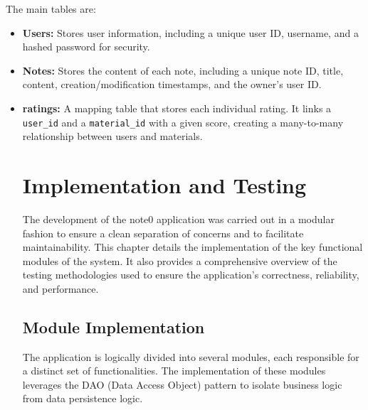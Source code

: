 \documentclass[12pt, a4paper]{report}
\begin{document}
The main tables are:
\begin{itemize}
    \item \textbf{Users:} Stores user information, including a unique user ID, username, and a hashed password for security.
    \item \textbf{Notes:} Stores the content of each note, including a unique note ID, title, content, creation/modification timestamps, and the owner's user ID.
   \item \textbf{ratings:} A mapping table that stores each individual rating. It links a \texttt{user\_id} and a \texttt{material\_id} with a given score, creating a many-to-many relationship between users and materials.




\chapter{Implementation and Testing}
The development of the note0 application was carried out in a modular fashion to ensure a clean separation of concerns and to facilitate maintainability. This chapter details the implementation of the key functional modules of the system. It also provides a comprehensive overview of the testing methodologies used to ensure the application's correctness, reliability, and performance.

\section{Module Implementation}
The application is logically divided into several modules, each responsible for a distinct set of functionalities. The implementation of these modules leverages the DAO (Data Access Object) pattern to isolate business logic from data persistence logic.


\end{itemize}
\end{document}
